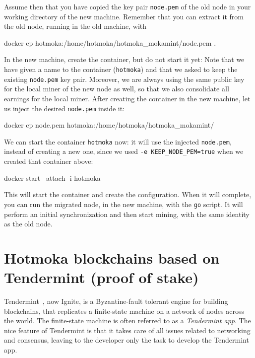 Assume then that you have copied the key pair \texttt{node.pem} of the old node in your working directory of the new machine.
Remember that you can extract it from the old node, running in the old machine, with
%
\begin{shellcommandbox}\begin{ttlst}
docker cp hotmoka:/home/hotmoka/hotmoka_mokamint/node.pem .
\end{ttlst}\end{shellcommandbox}
%
In the new machine, create the container, but do not start it yet:
%
%
Note that we have given a name to the container (\texttt{hotmoka}) and that we asked to keep the existing
\texttt{node.pem} key pair. Moreover, we are always using the same public key for the local miner of the new node as well,
so that we also consolidate all earnings for the local miner. After creating the container in the new machine, let us
inject the desired \texttt{node.pem} inside it:
%
\begin{shellcommandbox}\begin{ttlst}
docker cp node.pem hotmoka:/home/hotmoka/hotmoka_mokamint/
\end{ttlst}\end{shellcommandbox}
%
We can start the container \texttt{hotmoka} now: it will use the injected \texttt{node.pem}, instead
of creating a new one, since we used \texttt{-e KEEP\_NODE\_PEM=true} when we created that container above:
%
\begin{shellcommandbox}\begin{ttlst}
docker start --attach -i hotmoka
\end{ttlst}\end{shellcommandbox}
%
This will start the container and create the configuration. When it will complete, you can run the migrated node, in the new machine,
with the \texttt{go} script. It will perform an initial synchronization and then start mining,
with the same identity as the old node.

\section{Hotmoka blockchains based on Tendermint (proof of stake)}\label{sec:hotmoka_tendermint}

Tendermint~\cite{Tendermint}, now Ignite, is a
Byzantine-fault tolerant engine for building blockchains, that
replicates a finite-state machine on a network of nodes across the world.
The finite-state machine is often referred to as a \emph{Tendermint app}.
The nice feature of Tendermint is that it takes care of all
issues related to networking and consensus, leaving to the
developer only the task to develop the Tendermint app.

